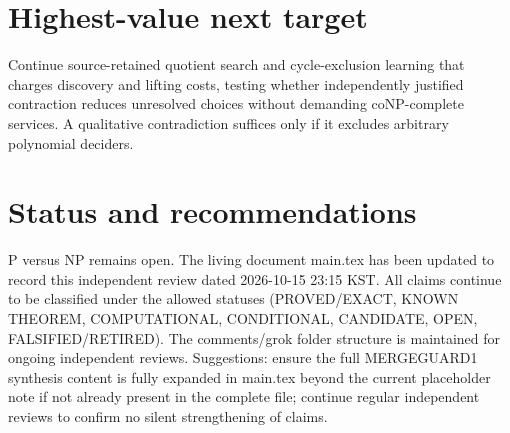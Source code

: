 \documentclass[11pt]{article}
\begin{document}
\section{Highest-value next target}
Continue source-retained quotient search and cycle-exclusion learning that charges discovery and lifting costs, testing whether independently justified contraction reduces unresolved choices without demanding coNP-complete services. A qualitative contradiction suffices only if it excludes arbitrary polynomial deciders.

\section{Status and recommendations}
P versus NP remains open. The living document main.tex has been updated to record this independent review dated 2026-10-15 23:15 KST. All claims continue to be classified under the allowed statuses (PROVED/EXACT, KNOWN THEOREM, COMPUTATIONAL, CONDITIONAL, CANDIDATE, OPEN, FALSIFIED/RETIRED). The comments/grok folder structure is maintained for ongoing independent reviews. Suggestions: ensure the full MERGEGUARD1 synthesis content is fully expanded in main.tex beyond the current placeholder note if not already present in the complete file; continue regular independent reviews to confirm no silent strengthening of claims.

\end{document}
